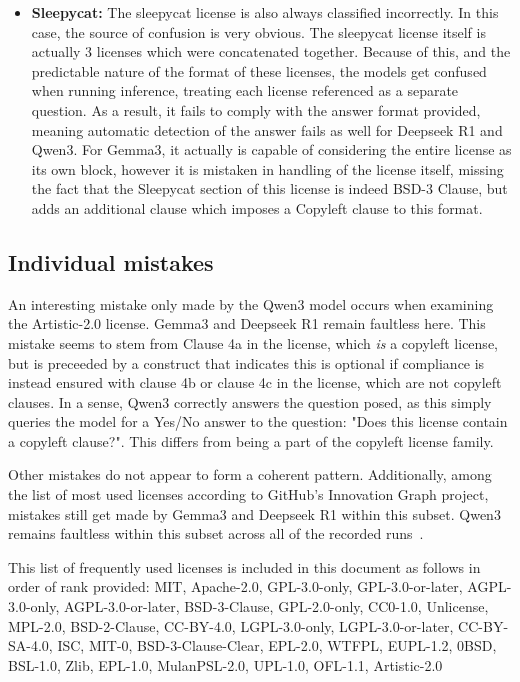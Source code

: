 \begin{itemize}
	\item \textbf{Sleepycat:} The sleepycat license is also always classified incorrectly. In this case, the source of confusion is very obvious. The sleepycat license itself is actually 3 licenses which were concatenated together. Because of this, and the predictable nature of the format of these licenses, the models get confused when running inference, treating each license referenced as a separate question. As a result, it fails to comply with the answer format provided, meaning automatic detection of the answer fails as well for Deepseek R1 and Qwen3. For Gemma3, it actually is capable of considering the entire license as its own block, however it is mistaken in handling of the license itself, missing the fact that the Sleepycat section of this license is indeed BSD-3 Clause, but adds an additional clause which imposes a Copyleft clause to this format.
\end{itemize}

\subsection{Individual mistakes}

An interesting mistake only made by the Qwen3 model occurs when examining the Artistic-2.0 license. Gemma3 and Deepseek R1 remain faultless here. This mistake seems to stem from Clause 4a in the license, which \textit{is} a copyleft license, but is preceeded by a construct that indicates this is optional if compliance is instead ensured with clause 4b or clause 4c in the license, which are not copyleft clauses. In a sense, Qwen3 correctly answers the question posed, as this simply queries the model for a Yes/No answer to the question: "Does this license contain a copyleft clause?". This differs from being a part of the copyleft license family.

Other mistakes do not appear to form a coherent pattern. Additionally, among the list of most used licenses according to GitHub's Innovation Graph project, mistakes still get made by Gemma3 and Deepseek R1 within this subset. Qwen3 remains faultless within this subset across all of the recorded runs~\cite{github_innovation_graph_2025}.

This list of frequently used licenses is included in this document as follows in order of rank provided: MIT, Apache-2.0, GPL-3.0-only, GPL-3.0-or-later, AGPL-3.0-only, AGPL-3.0-or-later, BSD-3-Clause, GPL-2.0-only, CC0-1.0, Unlicense, MPL-2.0, BSD-2-Clause, CC-BY-4.0, LGPL-3.0-only, LGPL-3.0-or-later, CC-BY-SA-4.0, ISC, MIT-0, BSD-3-Clause-Clear, EPL-2.0, WTFPL, EUPL-1.2, 0BSD, BSL-1.0, Zlib, EPL-1.0, MulanPSL-2.0, UPL-1.0, OFL-1.1, Artistic-2.0

